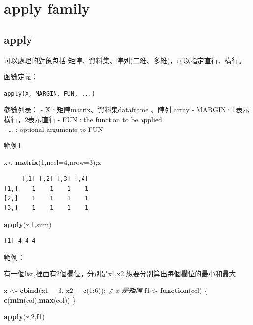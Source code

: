 \documentclass[]{book}
\newenvironment{Shaded}{\begin{snugshade}}{\end{snugshade}}
\newcommand{\CommentTok}[1]{\textcolor[rgb]{0.56,0.35,0.01}{\textit{#1}}}
\newcommand{\ControlFlowTok}[1]{\textcolor[rgb]{0.13,0.29,0.53}{\textbf{#1}}}
\newcommand{\DataTypeTok}[1]{\textcolor[rgb]{0.13,0.29,0.53}{#1}}
\newcommand{\DecValTok}[1]{\textcolor[rgb]{0.00,0.00,0.81}{#1}}
\newcommand{\KeywordTok}[1]{\textcolor[rgb]{0.13,0.29,0.53}{\textbf{#1}}}
\newcommand{\NormalTok}[1]{#1}
\newcommand{\OperatorTok}[1]{\textcolor[rgb]{0.81,0.36,0.00}{\textbf{#1}}}
\newcommand{\StringTok}[1]{\textcolor[rgb]{0.31,0.60,0.02}{#1}}
\theoremstyle{definition}
\theoremstyle{definition}
\theoremstyle{definition}
\theoremstyle{remark}
\begin{document}
\hypertarget{apply-family}{%
\section{apply family}\label{apply-family}}

\hypertarget{apply}{%
\subsection{apply}\label{apply}}

可以處理的對象包括 矩陣、資料集、陣列(二維、多維)，可以指定直行、橫行。

函數定義：

\begin{verbatim}
apply(X, MARGIN, FUN, ...)
\end{verbatim}

參數列表： - X : 矩陣matrix、資料集dataframe 、陣列 array - MARGIN :
1表示橫行，2表示直行 - FUN : the function to be applied\\
- \ldots{} : optional arguments to FUN

範例1

\begin{Shaded}
\begin{Highlighting}[]
\NormalTok{x<-}\KeywordTok{matrix}\NormalTok{(}\DecValTok{1}\NormalTok{,}\DataTypeTok{ncol=}\DecValTok{4}\NormalTok{,}\DataTypeTok{nrow=}\DecValTok{3}\NormalTok{);x}
\end{Highlighting}
\end{Shaded}

\begin{verbatim}
     [,1] [,2] [,3] [,4]
[1,]    1    1    1    1
[2,]    1    1    1    1
[3,]    1    1    1    1
\end{verbatim}

\begin{Shaded}
\begin{Highlighting}[]
\KeywordTok{apply}\NormalTok{(x,}\DecValTok{1}\NormalTok{,sum)}
\end{Highlighting}
\end{Shaded}

\begin{verbatim}
[1] 4 4 4
\end{verbatim}

範例：

有一個list,裡面有2個欄位，分別是x1,x2,想要分別算出每個欄位的最小和最大

\begin{Shaded}
\begin{Highlighting}[]
\NormalTok{x <-}\StringTok{ }\KeywordTok{cbind}\NormalTok{(}\DataTypeTok{x1 =} \DecValTok{3}\NormalTok{, }\DataTypeTok{x2 =} \KeywordTok{c}\NormalTok{(}\DecValTok{1}\OperatorTok{:}\DecValTok{6}\NormalTok{)); }\CommentTok{# x 是矩陣}
\NormalTok{f1<-}\StringTok{ }\ControlFlowTok{function}\NormalTok{(col) \{}
   \KeywordTok{c}\NormalTok{(}\KeywordTok{min}\NormalTok{(col),}\KeywordTok{max}\NormalTok{(col)) }
\NormalTok{ \}}

 \KeywordTok{apply}\NormalTok{(x,}\DecValTok{2}\NormalTok{,f1)}
\end{Highlighting}
\end{Shaded}
\end{document}
